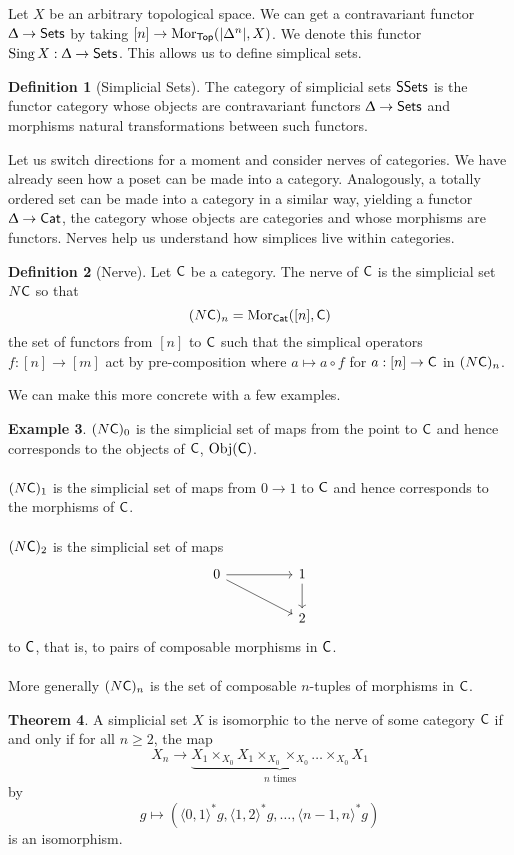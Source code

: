 \documentclass{amsart}
\theoremstyle{definition}
\newtheorem{theorem}{Theorem}[section]
\newtheorem{example}[theorem]{Example}
\newtheorem{definition}[theorem]{Definition}
\numberwithin{equation}{section}
\begin{document}
Let $X$ be an arbitrary topological space. We can get a contravariant functor $\Updelta\to\mathsf{Sets}$ by taking $[n]\to\mathrm{Mor}_{\mathsf{Top}}(|\Delta^{n}|,X)$. We denote this functor $\operatorname{Sing} X:\Updelta\to\mathsf{Sets}$. This allows us to define simplical sets. 
\begin{definition}[Simplicial Sets]
  The category of simplicial sets $\mathsf{SSets}$ is the functor category whose objects are contravariant functors $\Updelta\to\mathsf{Sets}$ and morphisms natural transformations between such functors. 
\end{definition}

Let us switch directions for a moment and consider nerves of categories. We have already seen how a poset can be made into a category. Analogously, a totally ordered set can be made into a category in a similar way, yielding a functor $\Updelta\to\mathsf{Cat}$, the category whose objects are categories and whose morphisms are functors. Nerves help us understand how simplices live within categories. 
\begin{definition}[Nerve]
  Let $\mathsf{C}$ be a category. The nerve of $\mathsf{C}$ is the simplicial set $N\mathsf{C}$ so that 
  $$(N\mathsf{C})_{n}=\mathrm{Mor}_{\mathsf{Cat}}([n],\mathsf{C})$$
  the set of functors from $[n]$ to $\mathsf{C}$ such that the simplical operators $f:[n]\to[m]$ act by pre-composition where $a\mapsto a\circ f$ for $a:[n]\to\mathsf{C}$ in $(N\mathsf{C})_{n}$. 
\end{definition}
We can make this more concrete with a few examples. 
\begin{example}
  $(N\mathsf{C})_{0}$ is the simplicial set of maps from the point to $\mathsf{C}$ and hence corresponds to the objects of $\mathsf{C}$, $\mathrm{Obj}(\mathsf{C})$. 
  \\\\
  $(N\mathsf{C})_{1}$ is the simplicial set of maps from $0\to 1$ to $\mathsf{C}$ and hence corresponds to the morphisms of $\mathsf{C}$. 
  \\\\
  $(N\mathsf{C})_{2}$ is the simplicial set of maps 
  $$\begin{tikzcd}
    0 && 1 \\
    && 2
    \arrow[from=1-1, to=1-3]
    \arrow[from=1-3, to=2-3]
    \arrow[from=1-1, to=2-3]
  \end{tikzcd}$$
  to $\mathsf{C}$, that is, to pairs of composable morphisms in $\mathsf{C}$. 
  \\\\
  More generally $(N\mathsf{C})_{n}$ is the set of composable $n$-tuples of morphisms in $\mathsf{C}$. 
\end{example}
\begin{theorem}
  A simplicial set $X$ is isomorphic to the nerve of some category $\mathsf{C}$ if and only if for all $n\geq2$, the map 
  $$X_{n}\to \underbrace{X_{1}\times_{X_{0}}X_{1}\times_{X_{0}}\times_{X_{0}}\dots\times_{X_{0}}X_{1}}_{n\text{ times}}$$
  by
  $$g\mapsto (\langle0,1\rangle^{*}g, \langle1,2\rangle^{*}g,\dots,\langle n-1,n\rangle^{*}g)$$
  is an isomorphism. 
\end{theorem}
\end{document}
